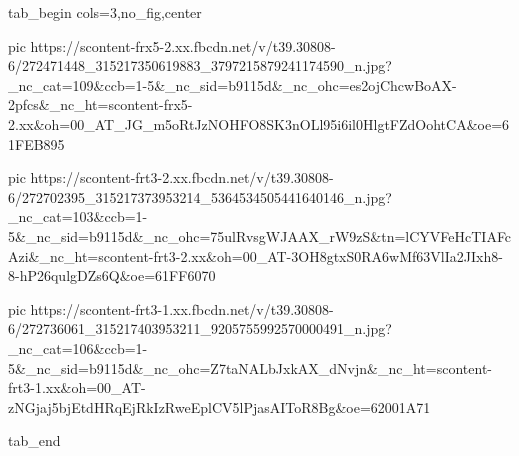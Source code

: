  
 
 
 
 


\ifcmt
  tab_begin cols=3,no_fig,center

     pic https://scontent-frx5-2.xx.fbcdn.net/v/t39.30808-6/272471448_315217350619883_3797215879241174590_n.jpg?_nc_cat=109&ccb=1-5&_nc_sid=b9115d&_nc_ohc=es2ojChcwBoAX-2pfcs&_nc_ht=scontent-frx5-2.xx&oh=00_AT_JG_m5oRtJzNOHFO8SK3nOLl95i6il0HlgtFZdOohtCA&oe=61FEB895

     pic https://scontent-frt3-2.xx.fbcdn.net/v/t39.30808-6/272702395_315217373953214_5364534505441640146_n.jpg?_nc_cat=103&ccb=1-5&_nc_sid=b9115d&_nc_ohc=75ulRvsgWJAAX_rW9zS&tn=lCYVFeHcTIAFcAzi&_nc_ht=scontent-frt3-2.xx&oh=00_AT-3OH8gtxS0RA6wMf63VlIa2JIxh8-8-hP26qulgDZs6Q&oe=61FF6070

     pic https://scontent-frt3-1.xx.fbcdn.net/v/t39.30808-6/272736061_315217403953211_9205755992570000491_n.jpg?_nc_cat=106&ccb=1-5&_nc_sid=b9115d&_nc_ohc=Z7taNALbJxkAX_dNvjn&_nc_ht=scontent-frt3-1.xx&oh=00_AT-zNGjaj5bjEtdHRqEjRkIzRweEplCV5lPjasAIToR8Bg&oe=62001A71

  tab_end
\fi
